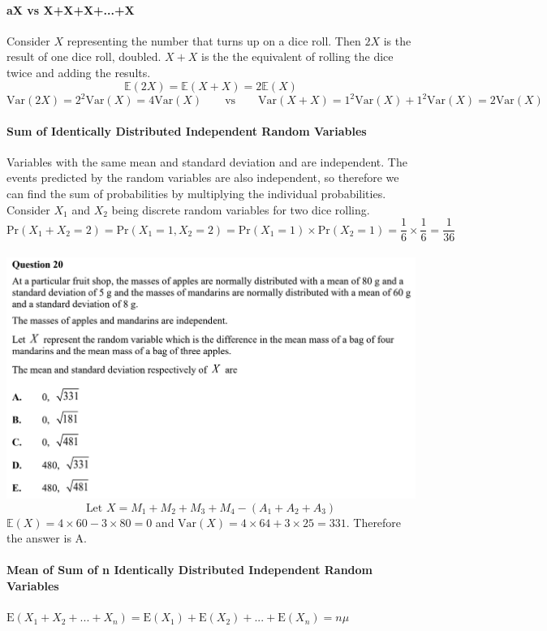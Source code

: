 \documentclass[a4paper,twoside,10pt]{article}
\newcommand{\E}{\mathbb{E}}
\newenvironment{examquestion}[1]{%
	\mbox{}\\\tcolorbox[beamer,breakable,%
	title=Exam-style Question: #1,standard jigsaw,opacityback=0, colframe=red!75!black, boxrule=2pt]}{\endtcolorbox\mbox{}\\}
\begin{document}
			\paragraph{aX vs X+X+X+...+X} Consider $X$ representing the number that turns up on a dice roll. Then $2X$ is the result of one dice roll, doubled. $X+X$ is the the equivalent of rolling the dice twice and adding the results.
			\[
				\E(2X)=\E(X+X)=2\E(X)
			\]
			\[
				\mathrm{Var}(2X)=2^2\mathrm{Var}(X)=4\mathrm{Var}(X) \qquad \text{vs} \qquad \mathrm{Var}(X+X)=1^2\mathrm{Var}(X)+1^2\mathrm{Var}(X)=2\mathrm{Var}(X)
			\]
			
			\paragraph{Sum of Identically Distributed Independent Random Variables} Variables with the same mean and standard deviation and are independent. The events predicted by the random variables are also independent, so therefore we can find the sum of probabilities by multiplying the individual probabilities. Consider $X_1$ and $X_2$ being discrete random variables for two dice rolling.
			\[
				\mathrm{Pr}(X_1+X_2=2)=\mathrm{Pr}(X_1=1,X_2=2)=\mathrm{Pr}(X_1=1)\times\mathrm{Pr}(X_2=1)=\frac{1}{6}\times\frac{1}{6}=\frac{1}{36}
			\]
			\begin{examquestion}{2023 MAV Spec E2 QA20}
				\includegraphics[width=\linewidth]{./img/2023mavspece2a20.png}
				\[
					\text{Let }X=M_1+M_2+M_3+M_4-(A_1+A_2+A_3)
				\]
				$\E(X)=4\times60-3\times80=0$ and $\mathrm{Var}(X)=4\times64+3\times25=331$. Therefore the answer is A.
			\end{examquestion}
			
			\paragraph{Mean of Sum of n Identically Distributed Independent Random Variables} $\displaystyle\mathrm{E}(X_1+X_2+...+X_n)=\mathrm{E}(X_1)+\mathrm{E}(X_2)+...+\mathrm{E}(X_n)=n\mu$
			
\end{document}
